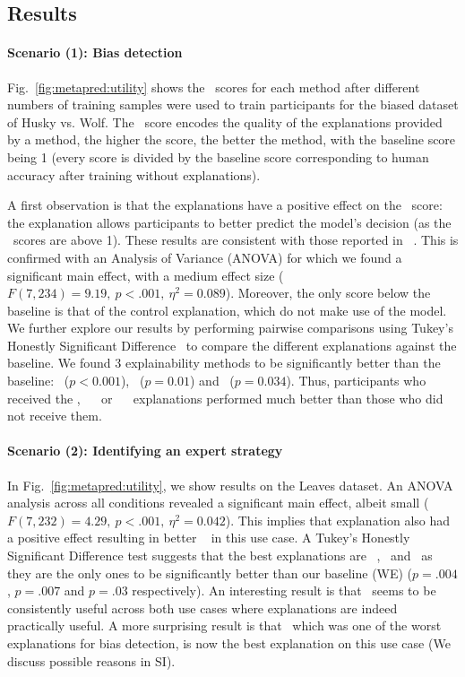 \subsection{Results}
\label{sec:metapred:results}

\paragraph{Scenario (1): Bias detection}

Fig.~\ref{fig:metapred:utility} shows the \metrick~scores for each method after different numbers of training samples were used to train participants for the biased dataset of Husky vs. Wolf.
The \metric~score encodes the quality of the explanations provided by a method, the higher the score, the better the method, with the baseline score being 1 (every score is divided by the baseline score corresponding to human accuracy after training without explanations). 


A first observation is that the explanations have a positive effect on the \metrick~score: the explanation allows participants to better predict the model's decision (as the \metric~scores are above 1). These results are consistent with those reported in ~\cite{ribeiro2016lime}. This is confirmed with an Analysis of Variance (ANOVA) for which we found a significant main effect, with a medium effect size ($F(7, 234) = 9.19,\ p < .001,\ \eta^2 = 0.089$). 
Moreover, the only score below the baseline is that of the control explanation, which do not make use of the model. 
We further explore our results by performing pairwise comparisons using Tukey’s Honestly Significant Difference~\cite{tukey1949comparing} to compare the different explanations against the baseline. We found 3 explainability methods to be significantly better than the baseline: \expgc~($p<0.001$), \expoc~($p = 0.01$) and \expsg~($p = 0.034$).
Thus, participants who received the \expgc, ~\expoc~ or ~\expsg~  explanations performed much better than those who did not receive them. 

\paragraph{Scenario (2): Identifying an expert strategy}

In Fig.~\ref{fig:metapred:utility}, we show results on the Leaves dataset. An ANOVA analysis across all conditions revealed a significant main effect, albeit small ($F(7, 232) = 4.29,\ p < .001,\ \eta^2 = 0.042$).
This implies that explanation also had a positive effect resulting in better \mp~ in this use case.
A Tukey’s Honestly Significant Difference test suggests that the best explanations are \expsa~, \expsg~and \expig~as they are the only ones to be significantly better than our baseline (WE) ($p = .004$, $p = .007$ and $p = .03$ respectively). An interesting result is that \expsg~seems to be consistently useful across both use cases where explanations are indeed practically useful.
A more surprising result is that \expsa~which was one of the worst explanations for bias detection, is now the best explanation on this use case (We discuss possible reasons in SI).

